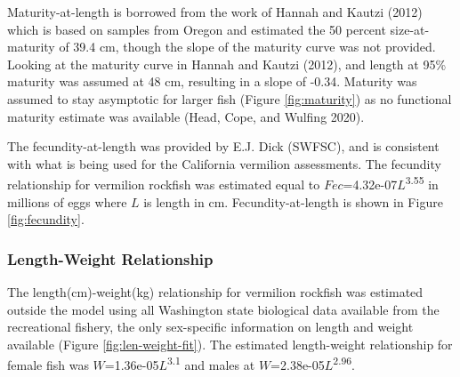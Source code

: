 \documentclass[11pt,
  english,
  a4paper,
]{article}
\begin{document}
\leavevmode\tagmcend\tagstructend


Maturity-at-length is borrowed from the work of Hannah and Kautzi {(2012)\leavevmode\tagmcend\tagstructend} which is based on samples from Oregon and estimated the 50 percent size-at-maturity of 39.4 cm, though the slope of the maturity curve was not provided. Looking at the maturity curve in Hannah and Kautzi {(2012)\leavevmode\tagmcend\tagstructend}, and length at 95\% maturity was assumed at 48 cm, resulting in a slope of -0.34. Maturity was assumed to stay asymptotic for larger fish (Figure \ref{fig:maturity}) as no functional maturity estimate was available {(Head, Cope, and Wulfing 2020)\leavevmode\tagmcend\tagstructend}.

\leavevmode\tagmcend\tagstructend\par


The fecundity-at-length was provided by E.J. Dick (SWFSC), and is consistent with what is being used for the California vermilion assessments. The fecundity relationship for vermilion rockfish was estimated equal to {\(Fec\)\leavevmode\tagmcend\tagstructend}=4.32e-07{\(L\)\leavevmode\tagmcend\tagstructend}\textsuperscript{3.55} in millions of eggs where {\(L\)\leavevmode\tagmcend\tagstructend} is length in cm. Fecundity-at-length is shown in Figure \ref{fig:fecundity}.

\leavevmode\tagmcend\tagstructend\par


\hypertarget{length-weight-relationship}{%
\subsubsection{Length-Weight Relationship}\label{length-weight-relationship}}

\leavevmode\tagmcend\tagstructend


The length(cm)-weight(kg) relationship for vermilion rockfish was estimated outside the model using all Washington state biological data available from the recreational fishery, the only sex-specific information on length and weight available (Figure \ref{fig:len-weight-fit}). The estimated length-weight relationship for female fish was {\(W\)\leavevmode\tagmcend\tagstructend}=1.36e-05{\(L\)\leavevmode\tagmcend\tagstructend}\textsuperscript{3.1} and males at {\(W\)\leavevmode\tagmcend\tagstructend}=2.38e-05{\(L\)\leavevmode\tagmcend\tagstructend}\textsuperscript{2.96}.
\end{document}
